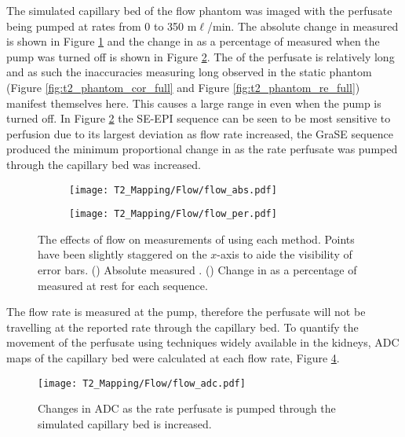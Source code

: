 The simulated capillary bed of the flow phantom was imaged with the perfusate being pumped at rates from 0 to 350 m$\ell$/min. The absolute change in measured \ttwo is shown in Figure \ref{fig:t2_flow_abs} and the change in \ttwo as a percentage of \ttwo measured when the pump was turned off is shown in Figure \ref{fig:t2_flow_percent}. The \ttwo of the perfusate is relatively long and as such the inaccuracies measuring long \ttwo observed in the static phantom (Figure \ref{fig:t2_phantom_cor_full} and Figure \ref{fig:t2_phantom_re_full}) manifest themselves here. This causes a large range in \ttwo even when the pump is turned off. In Figure \ref{fig:t2_flow_percent} the \ac{SE}-\ac{EPI} sequence can be seen to be most sensitive to perfusion due to its largest deviation as flow rate increased, the \ac{GraSE} sequence produced the minimum proportional change in \ttwo as the rate perfusate was pumped through the capillary bed was increased.
\begin{figure}[H]
	\centering
	\begin{subfigure}[c]{0.47\textwidth}
		\centering
		\texttt{[image: T2\_Mapping/Flow/flow\_abs.pdf]}
		\caption{}
		\label{fig:t2_flow_abs}
	\end{subfigure}
	\hfill
	\begin{subfigure}[c]{0.47\textwidth}
		\centering
		\texttt{[image: T2\_Mapping/Flow/flow\_per.pdf]}
		\caption{}
		\label{fig:t2_flow_percent}
	\end{subfigure}
	\caption{The effects of flow on measurements of \ttwo using each method. Points have been slightly staggered on the $x$-axis to aide the visibility of error bars. () Absolute measured \ttwo. () Change in \ttwo as a percentage of \ttwo measured at rest for each sequence.}
	\label{fig:t2_flow}
\end{figure}

The flow rate is measured at the pump, therefore the perfusate will not be travelling at the reported rate through the capillary bed. To quantify the movement of the perfusate using techniques widely available in the kidneys, \ac{ADC} maps of the capillary bed were calculated at each flow rate, Figure \ref{fig:t2_flow_adc}.

\begin{figure}[H]
	\centering
	\texttt{[image: T2\_Mapping/Flow/flow\_adc.pdf]}
	\caption{Changes in ADC as the rate perfusate is pumped through the simulated capillary bed is increased.}
	\label{fig:t2_flow_adc}	
\end{figure} 

